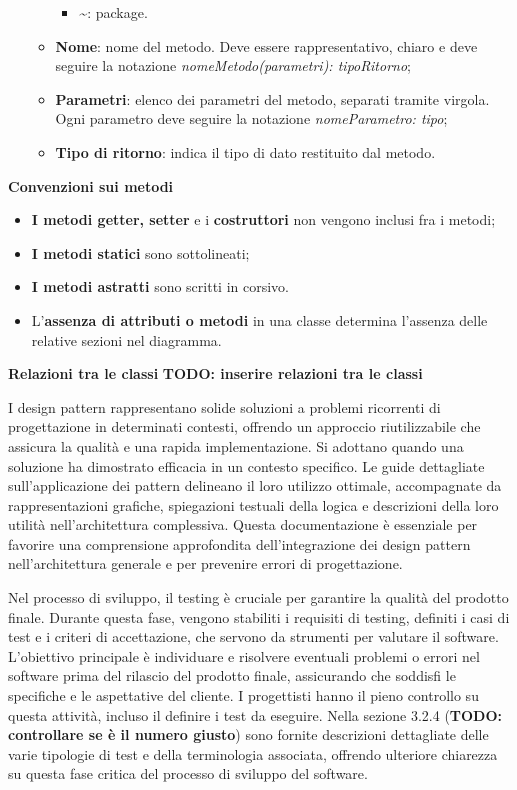 \begin{enumerate}
\begin{itemize}
\begin{itemize}
			\item \textbf{\textasciitilde}: package.
		\end{itemize}
		\item \textbf{Nome}: nome del metodo. Deve essere rappresentativo, chiaro e deve seguire la notazione \textit{nomeMetodo(parametri): tipoRitorno};
		\item \textbf{Parametri}: elenco dei parametri del metodo, separati tramite virgola. Ogni parametro deve seguire la notazione \textit{nomeParametro: tipo};
		\item \textbf{Tipo di ritorno}: indica il tipo di dato restituito dal metodo.
	\end{itemize}
\end{enumerate}

\textbf{Convenzioni sui metodi}
\begin{itemize}
	\item \textbf{I metodi getter, setter} e i \textbf{costruttori} non vengono inclusi fra i metodi;
	\item \textbf{I metodi statici} sono sottolineati;
	\item \textbf{I metodi astratti} sono scritti in corsivo.
	\item L'\textbf{assenza di attributi o metodi} in una classe determina l'assenza delle relative sezioni nel diagramma.
\end{itemize}

\textbf{Relazioni tra le classi}
\textbf{TODO: inserire relazioni tra le classi}

I design pattern rappresentano solide soluzioni a problemi ricorrenti di progettazione in determinati contesti, offrendo un approccio riutilizzabile che assicura la qualità e una rapida implementazione. Si adottano quando una soluzione ha dimostrato efficacia in un contesto specifico. Le guide dettagliate sull'applicazione dei pattern delineano il loro utilizzo ottimale, accompagnate da rappresentazioni grafiche, spiegazioni testuali della logica e descrizioni della loro utilità nell'architettura complessiva. Questa documentazione è essenziale per favorire una comprensione approfondita dell'integrazione dei design pattern nell'architettura generale e per prevenire errori di progettazione.

Nel processo di sviluppo, il testing è cruciale per garantire la qualità del prodotto finale. Durante questa fase, vengono stabiliti i requisiti di testing, definiti i casi di test e i criteri di accettazione, che servono da strumenti per valutare il software.\\ L'obiettivo principale è individuare e risolvere eventuali problemi o errori nel software prima del rilascio del prodotto finale, assicurando che soddisfi le specifiche e le aspettative del cliente. I progettisti hanno il pieno controllo su questa attività, incluso il definire i test da eseguire. Nella sezione 3.2.4 (\textbf{TODO: controllare se è il numero giusto}) sono fornite descrizioni dettagliate delle varie tipologie di test e della terminologia associata, offrendo ulteriore chiarezza su questa fase critica del processo di sviluppo del software.

